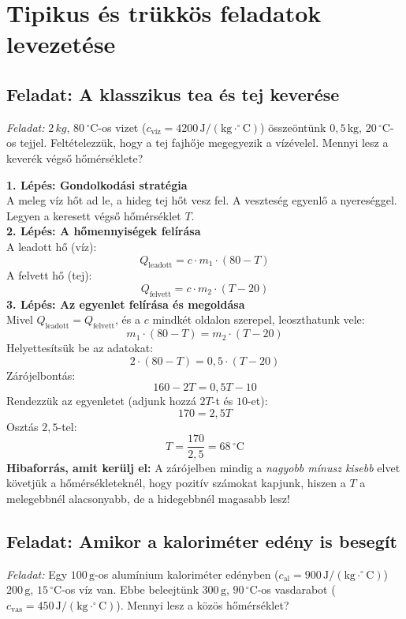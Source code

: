 \documentclass[11pt,a4paper]{article}
\begin{document}
\section{Tipikus és trükkös feladatok levezetése}

\subsection{Feladat: A klasszikus tea és tej keverése}
\textit{Feladat:} $2\,kg$, $80\,^\circ\text{C}$-os vizet ($c_{\text{víz}} = 4200\,\text{J}/(\text{kg}\cdot^\circ\text{C})$) összeöntünk $0{,}5\,\text{kg}$, $20\,^\circ\text{C}$-os tejjel. Feltételezzük, hogy a tej fajhője megegyezik a vízévelel. Mennyi lesz a keverék végső hőmérséklete?

\begin{tcolorbox}[title=Megoldási lépések]
\textbf{1. Lépés: Gondolkodási stratégia}\\
A meleg víz hőt ad le, a hideg tej hőt vesz fel. A veszteség egyenlő a nyereséggel. Legyen a keresett végső hőmérséklet $T$.\\[6pt]
\textbf{2. Lépés: A hőmennyiségek felírása}\\
A leadott hő (víz): 
$$Q_{\text{leadott}} = c \cdot m_1 \cdot (80 - T)$$
A felvett hő (tej): 
$$Q_{\text{felvett}} = c \cdot m_2 \cdot (T - 20)$$
\textbf{3. Lépés: Az egyenlet felírása és megoldása}\\
Mivel $Q_{\text{leadott}} = Q_{\text{felvett}}$, és a $c$ mindkét oldalon szerepel, leoszthatunk vele:
$$m_1 \cdot (80 - T) = m_2 \cdot (T - 20)$$
Helyettesítsük be az adatokat:
$$2 \cdot (80 - T) = 0{,}5 \cdot (T - 20)$$
Zárójelbontás:
$$160 - 2T = 0{,}5T - 10$$
Rendezzük az egyenletet (adjunk hozzá $2T$-t és $10$-et):
$$170 = 2{,}5T$$
Osztás $2{,}5$-tel:
$$T = \frac{170}{2{,}5} = 68\,^\circ\text{C}$$
\textbf{Hibaforrás, amit kerülj el:} A zárójelben mindig a \textit{nagyobb mínusz kisebb} elvet követjük a hőmérsékleteknél, hogy pozitív számokat kapjunk, hiszen a $T$ a melegebbnél alacsonyabb, de a hidegebbnél magasabb lesz!
\end{tcolorbox}

\subsection{Feladat: Amikor a kaloriméter edény is besegít}
\textit{Feladat:} Egy $100\,\text{g}$-os alumínium kaloriméter edényben ($c_{\text{al}} = 900\,\text{J}/(\text{kg}\cdot^\circ\text{C})$) $200\,\text{g}$, $15\,^\circ\text{C}$-os víz van. Ebbe beleejtünk $300\,\text{g}$, $90\,^\circ\text{C}$-os vasdarabot ($c_{\text{vas}} = 450\,\text{J}/(\text{kg}\cdot^\circ\text{C})$). Mennyi lesz a közös hőmérséklet?
\end{document}
